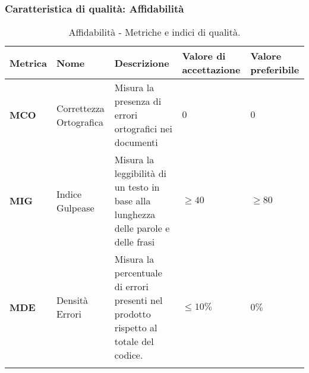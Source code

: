 \subsubsection{Caratteristica di qualità: Affidabilità}
\hspace{1pt}
    \begin{longtable}{|C{1.5cm}|L{3cm}|L{4cm}|L{2.5cm}|L{2.5cm}|}
            \hline
            \textbf{Metrica} & \textbf{Nome} & \textbf{Descrizione} & \textbf{Valore di accettazione} & \textbf{Valore preferibile} \\
            \hline
             \textbf{MCO} & Correttezza Ortografica & Misura la presenza di errori ortografici nei documenti & $0$ & $0$\\
            \hline
            \textbf{MIG} & Indice Gulpease & Misura la leggibilità di un testo in base alla lunghezza delle parole e delle frasi & $\geq 40$ & $\geq 80$ \\
            \hline
            \textbf{MDE} & Densità Errori & Misura la percentuale di errori presenti nel prodotto rispetto al totale del codice. & $\leq 10\%$ & $ 0\%$ \\
            \hline
            \caption{Affidabilità - Metriche e indici di qualità.}
        \label{tab:metriche_affidabilità_testo}
    \end{longtable}

